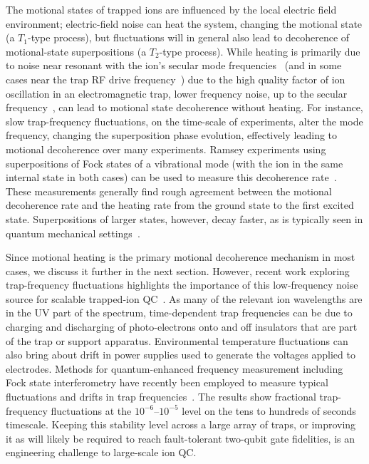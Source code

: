 \documentclass[%
reprint,
 amsmath,amssymb,
]{revtex4-1}
\begin{document}
The motional states of trapped ions are influenced by the local electric field environment; electric-field noise can heat the system, changing the motional state (a $T_{1}$-type process), but fluctuations will in general also lead to decoherence of motional-state superpositions (a $T_{2}$-type process).  While heating is primarily due to noise near resonant with the ion's secular mode frequencies~\cite{brownnutt_2015} (and in some cases near the trap RF drive frequency~\cite{blakestad_junction_2009,sedlacek_tnoise_2018}) due to the high quality factor of ion oscillation in an electromagnetic trap, lower frequency noise, up to the secular frequency~\cite{PhysRevA.93.043415_2016}, can lead to motional state decoherence without heating.  For instance, slow trap-frequency fluctuations, on the time-scale of experiments, alter the mode frequency, changing the superposition phase evolution, effectively leading to motional decoherence over many experiments.  Ramsey experiments using superpositions of Fock states of a vibrational mode (with the ion in the same internal state in both cases) can be used to measure this decoherence rate~\cite{PhysRevA.62.053807_2000,innsbruck_decoherence_2003,oxford_decoherence_2007,PhysRevA.93.043415_2016}.  These measurements generally find rough agreement between the motional decoherence rate and the heating rate from the ground state to the first excited state.  Superpositions of larger states, however, decay faster, as is typically seen in quantum mechanical settings~\cite{PhysRevA.62.053807_2000,brownnutt_2015}.

Since motional heating is the primary motional decoherence mechanism in most cases, we discuss it further in the next section.  However, recent work exploring trap-frequency fluctuations highlights the importance of this low-frequency noise source for scalable trapped-ion QC~\cite{nist_gate_2016}.  As many of the relevant ion wavelengths are in the UV part of the spectrum, time-dependent trap frequencies can be due to charging and discharging of photo-electrons onto and off insulators that are part of the trap or support apparatus.  Environmental temperature fluctuations can also bring about drift in power supplies used to generate the voltages applied to electrodes.   Methods for quantum-enhanced frequency measurement including Fock state interferometry have recently been employed to measure typical fluctuations and drifts in trap frequencies~\cite{schmidt_et_al_fock_state_measurement_2018,nist_fock_interferometry_2018}.  The results show fractional trap-frequency fluctuations at the $10^{-6}$--$10^{-5}$ level on the tens to hundreds of seconds timescale.  Keeping this stability level across a large array of traps, or improving it as will likely be required to reach fault-tolerant two-qubit gate fidelities, is an engineering challenge to large-scale ion QC.
\end{document}
